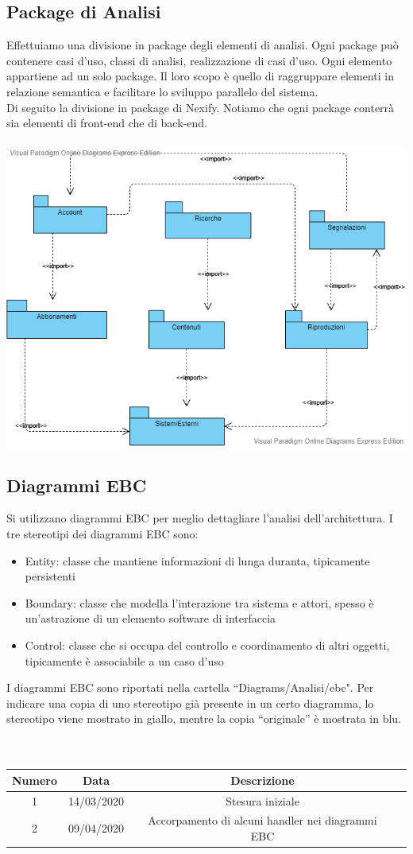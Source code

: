\newpage
\subsection{Package di Analisi}
Effettuiamo una divisione in package degli elementi di analisi. Ogni package può contenere casi d'uso, classi di analisi, realizzazione di casi d'uso. Ogni elemento appartiene ad un solo package. Il loro scopo è quello di raggruppare elementi in relazione semantica e facilitare lo sviluppo parallelo del sistema.\\
Di seguito la divisione in package di Nexify. Notiamo che ogni package conterrà sia elementi di front-end che di back-end.\\ \\
\includegraphics[width=14cm]{../Contents/Diagrams/Analisi/package/package_analisi.png}

\subsection{Diagrammi EBC}
Si utilizzano diagrammi EBC per meglio dettagliare l'analisi dell'architettura. I tre stereotipi dei diagrammi EBC sono:
\begin{itemize}
\item Entity: classe che mantiene informazioni di lunga duranta, tipicamente persistenti
\item Boundary: classe che modella l'interazione tra sistema e attori, spesso è un'astrazione di un elemento software di interfaccia
\item Control: classe che si occupa del controllo e coordinamento di altri oggetti, tipicamente è associabile a un caso d'uso
\end{itemize}
I diagrammi EBC sono riportati nella cartella ``Diagrams/Analisi/ebc". Per indicare una copia di uno stereotipo già presente in un certo diagramma, lo stereotipo viene mostrato in giallo, mentre la copia ``originale'' è mostrata in blu. \\

 \\ \\
\begin{tabular}{|c | c | c | c|} 
 	\hline
	 Numero & Data & Descrizione \\ [0.5ex] 
	\hline\hline
	1 & 14/03/2020 & Stesura iniziale \\ 
	\hline
	2 & 09/04/2020 & Accorpamento di alcuni handler nei diagrammi EBC \\
	\hline
\end{tabular}